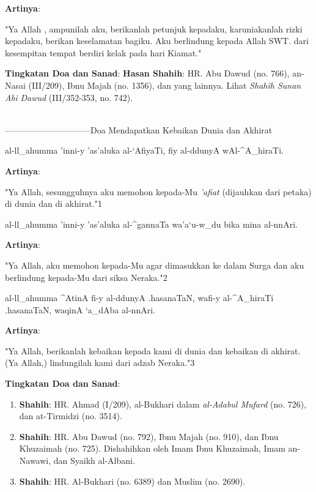 \documentclass[a4paper,12pt]{article}
\begin{document}
\noindent
\textbf{Artinya}:
\par
\indent
"Ya Allah , ampunilah aku, berikanlah petunjuk kepadaku, karuniakanlah 
rizki kepadaku, berikan keselamatan bagiku. Aku berlindung kepada Allah 
SWT. dari kesempitan tempat berdiri kelak pada hari Kiamat."\\
\par
\noindent
\textbf{Tingkatan Doa dan Sanad}: \textbf{Hasan Shahih}: HR. Abu Dawud (no.
766), an-Nasai (III/209), Ibnu Majah (no. 1356), dan yang lainnya. Lihat
\textit{Shah\^{i}h Sunan Abi Dawud} (III/352-353, no. 742).\\\\
\par
{}------------------------------Doa Mendapatkan Kebaikan Dunia dan Akhirat
\begin{arabtext}
\noindent
al-ll_ahumma 'inni-y 'as'aluka al-`AfiyaTi, fiy al-ddunyA wAl-^A_hiraTi.\\
\end{arabtext}
\noindent
\textbf{Artinya}:
\par
\indent
"Ya Allah, sesungguhnya aku memohon kepada-Mu \textit{'afiat} (dijauhkan 
dari petaka) di dunia dan di akhirat."{\scriptsize 1}\\
\begin{arabtext}
\noindent
al-ll_ahumma 'inni-y 'as'aluka al-^gannaTa wa'a`u-w_du bika mina al-nnAri.
\\
\end{arabtext}
\noindent
\textbf{Artinya}:
\par
\indent
"Ya Allah, aku memohon kepada-Mu agar dimasukkan ke dalam Surga dan aku 
berlindung kepada-Mu dari siksa Neraka."{\scriptsize 2}\\
\begin{arabtext}
\noindent
al-ll_ahumma ^AtinA fi-y al-ddunyA .hasanaTaN, wafi-y al-^A_hiraTi 
.hasanaTaN, waqinA `a_dAba al-nnAri.\\
\end{arabtext}
\noindent
\textbf{Artinya}:
\par
\indent
"Ya Allah, berikanlah kebaikan kepada kami di dunia dan kebaikan di 
akhirat. (Ya Allah,) lindungilah kami dari adzab Neraka."{\scriptsize 3}
\\
\par
\noindent
\textbf{Tingkatan Doa dan Sanad}:
\begin{enumerate}
\item \textbf{Shahih}: HR. Ahmad (I/209), al-Bukhari dalam 
\textit{al-Adabul Mufard} (no. 726), dan at-Tirmidzi (no. 3514).
\item \textbf{Shahih}: HR. Abu Dawud (no. 792), Ibnu Majah (no. 910), dan 
Ibnu Khuzaimah (no. 725). Dishahihkan oleh Imam Ibnu Khuzaimah, Imam 
an-Nawawi, dan Syaikh al-Albani.
\item \textbf{Shahih}: HR. Al-Bukhari (no. 6389) dan Muslim (no. 2690).\\\\
\end{enumerate}
\end{document}

